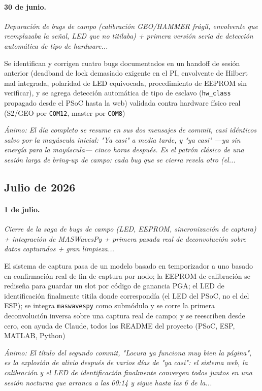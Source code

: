 \paragraph{30 de junio.}
\emph{Depuración de bugs de campo (calibración GEO/HAMMER frágil, envolvente que reemplazaba la señal, LED que no titilaba) + primera versión seria de detección automática de tipo de hardware...}

Se identifican y corrigen cuatro bugs documentados en un handoff de sesión anterior (deadband de lock demasiado exigente en el PI, envolvente de Hilbert mal integrada, polaridad de LED equivocada, procedimiento de EEPROM sin verificar), y se agrega detección automática de tipo de esclavo (\texttt{hw\_class} propagado desde el PSoC hasta la web) validada contra hardware físico real (S2/GEO por \texttt{COM12}, master por \texttt{COM8})

{\footnotesize\itshape \'Animo: El día completo se resume en sus dos mensajes de commit, casi idénticos salvo por la mayúscula inicial: "Ya casi" a media tarde, y "ya casi" ---ya sin energía para la mayúscula--- cinco horas después. Es el patrón clásico de una sesión larga de bring-up de campo: cada bug que se cierra revela otro (el...}

\subsection{Julio de 2026}
\paragraph{1 de julio.}
\emph{Cierre de la saga de bugs de campo (LED, EEPROM, sincronización de captura) + integración de MASWavesPy + primera pasada real de deconvolución sobre datos capturados + gran limpieza...}

El sistema de captura pasa de un modelo basado en temporizador a uno basado en confirmación real de fin de captura por nodo; la EEPROM de calibración se rediseña para guardar un slot por código de ganancia PGA; el LED de identificación finalmente titila donde correspondía (el LED del PSoC, no el del ESP); se integra \texttt{maswavespy} como submódulo y se corre la primera deconvolución inversa sobre una captura real de campo; y se reescriben desde cero, con ayuda de Claude, todos los README del proyecto (PSoC, ESP, MATLAB, Python)

{\footnotesize\itshape \'Animo: El título del segundo commit, "Locura ya funciona muy bien la página", es la explosión de alivio después de varios días de "ya casi": el sistema web, la calibración y el LED de identificación finalmente convergen todos juntos en una sesión nocturna que arranca a las 00:14 y sigue hasta las 6 de la...}

